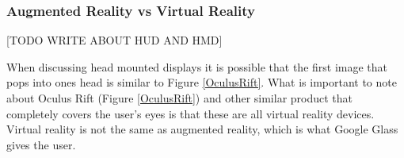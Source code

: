 	
	








\subsubsection{Augmented Reality vs Virtual Reality}
\label{subsubsec:augmentedrealityvsvirtualreality}

[TODO WRITE ABOUT HUD AND HMD]

When discussing head mounted displays it is possible that the first image that pops into ones head is similar to Figure \ref{OculusRift}. What is important to note about Oculus Rift (Figure \ref{OculusRift}) and other similar product that completely covers the user's eyes is that these are all virtual reality devices. Virtual reality is not the same as augmented reality, which is what Google Glass gives the user.



